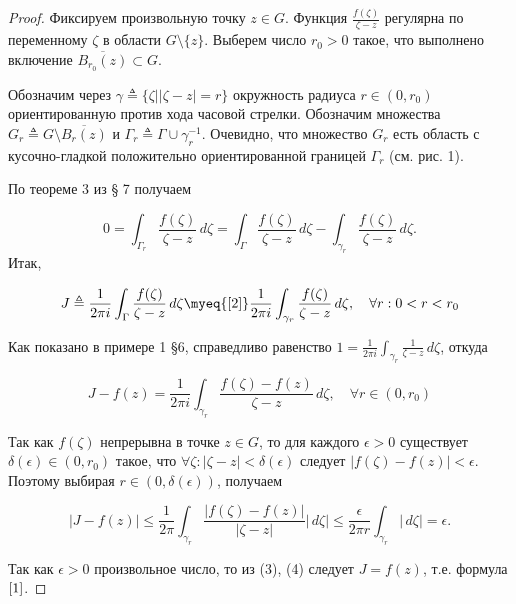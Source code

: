 \begin{proof}
Фиксируем произвольную точку $z \in G$. Функция $\frac{f(\zeta)}{\zeta - z}$ регулярна по переменному $\zeta$ в области $G \setminus \{z\}$. Выберем число $r_0 > 0$ такое, что выполнено включение $\overline{B_{r_0}(z)}\subset G$. 

Обозначим через $\gamma \triangleq \{ \zeta \bigl| |\zeta - z| = r \}$ окружность радиуса $r \in (0, r_0)$ ориентированную против хода часовой стрелки. Обозначим множества $G_r \triangleq G \setminus \overline{B_r(z)}$ и $\Gamma_r \triangleq \Gamma \cup \gamma_r^{-1}$. Очевидно, что множество $G_r$ есть область с кусочно-гладкой положительно ориентированной границей $\Gamma_r$ (см. рис. 1). 

По теореме 3 из § 7 получаем

 \begin{equation} \label{2}
 0 = \int_{\Gamma_r} \frac{f(\zeta)}{\zeta - z}\,d\zeta = \int_\Gamma \frac{f(\zeta)}{\zeta - z}\,d\zeta - \int_{\gamma_r} \frac{f(\zeta)}{\zeta - z}\,d\zeta.
 \end{equation}
Итак,

\begin{equation} \label{3}
J \triangleq \frac{1}{2\pi i} \int_\Gamma \frac{f(\zeta)}{\zeta - z}\,d\zeta \myeq{\eqref{2}} \frac{1}{2\pi i} \int_{\gamma_r} \frac{f(\zeta)}{\zeta - z}\,d\zeta,  \quad  \forall r: 0 < r < r_0
\end{equation}

Как показано в примере 1 §6, справедливо равенство $1 = \frac{1}{2\pi i} \int_{\gamma_r} \frac{1}{\zeta - z}\,d\zeta$, откуда 

$$J - f(z) = \frac{1}{2\pi i} \int_{\gamma_r} \frac{f(\zeta) - f(z)}{\zeta - z}\,d\zeta, \quad  \forall r \in (0,r_0)$$

Так как $f(\zeta)$ непрерывна в точке $z \in G$, то для каждого $\epsilon > 0$ существует $\delta(\epsilon) \in (0, r_0)$ такое, что $\forall \zeta : |\zeta - z| < \delta(\epsilon)$ следует $|f(\zeta) - f(z)| < \epsilon$. Поэтому выбирая $r \in (0, \delta(\epsilon))$, получаем

\begin{equation} \label{4}
|J - f(z)| \le \frac{1}{2\pi} \int_{\gamma_r} \frac{|f(\zeta) - f(z)|}{|\zeta - z|}|\,d\zeta| \le 
\frac{\epsilon}{2 \pi r} \int_{\gamma_r} |\,d\zeta| = \epsilon.
\end{equation}

Так как $\epsilon > 0$ произвольное число, то из (3), (4) следует $J = f(z)$, т.е. формула $\eqref{1}$.
\end{proof}

